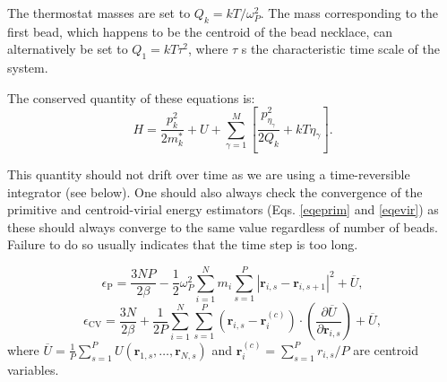 The thermostat masses are set to $Q_k=kT/\omega^2_P$. The mass corresponding to the first bead, which happens to be the centroid of the bead necklace, can alternatively be set to $Q_1=kT\tau^2$, where $\tau$ s the characteristic time scale of the system.
  
The conserved quantity of these equations is:
\begin{equation}
H= \frac{p_k^2}{2m_k^*} + U + \sum_{\gamma=1}^M\left[\frac{p^2_{\eta_\gamma}}{2Q_k}+kT\eta_\gamma\right]   .
\end{equation}

This quantity should not drift over time as we are using a time-reversible integrator (see below). One should also always check the convergence of the primitive and centroid-virial energy estimators (Eqs. \ref{eqeprim} and \ref{eqevir}) as these should always converge to the same value regardless of number of beads. Failure to do so usually indicates that the time step is too long.

\begin{equation}
\epsilon_\mathrm{P}=\frac{3NP}{2\beta}-\frac{1}{2}\omega_P^2\sum_{i=1}^N m_i\sum_{s=1}^P |\mathbf{r}_{i,s}-\mathbf{r}_{i,s+1}|^2+\overline{U} ,
\label{eqeprim}
\end{equation}
\begin{equation}
\epsilon_{\mathrm{CV}}=\frac{3N}{2\beta}+\frac{1}{2P}\sum_{i=1}^N\sum_{s=1}^P(\mathbf{r}_{i,s}-\mathbf{r}_i^{(c)})\cdot\left(\frac{\partial \overline{U}}{\partial\mathbf{r}_{i,s}} \right)+\overline{U}  ,
\label{eqevir}
\end{equation}
where $\overline{U}=\frac{1}{P}\sum_{s=1}^P U(\mathbf{r}_{1,s},\dots,\mathbf{r}_{N,s})$ and $\mathbf{r}_i^{(c)}=\sum_{s=1}^Pr_{i,s}/P $ are centroid variables.

